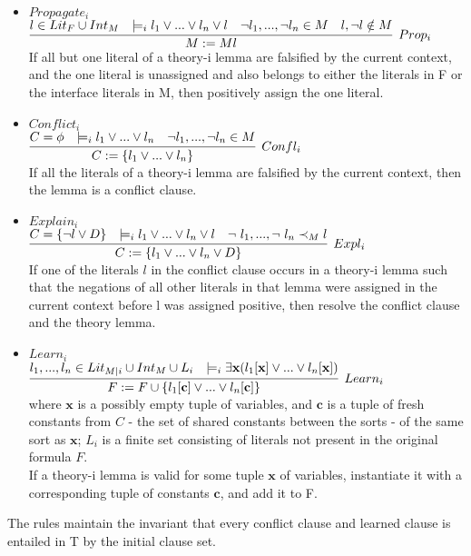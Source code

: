 \documentclass{article}
\begin{document}
\begin{itemize}
	\item $Propagate_i$ \\ $\infer[Prop_i]{M := Ml}	{l \in Lit_F \cup Int_M & 
		\models_i l_1 \lor ... \lor 
		l_n \lor l & \neg l_1, ..., \neg l_n \in M & l,\neg l \notin M}$ \\
	If all but one literal of a theory-i lemma are falsified by the 
	current context, and the one literal is unassigned and also belongs to 
	either the literals in F or the interface literals in M, then
	positively assign the one literal.
	\item $Conflict_i$ \\ $\infer[Confl_i]{C := \{l_1 \lor ... \lor l_n \}}
	{C = \phi & \models_i l_1 \lor ... \lor l_n & 
		\neg l_1, ..., \neg l_n \in M}$ \\
	If all the literals of a theory-i lemma are falsified by the 
	current context, then the lemma is a conflict clause.
	\item $Explain_i$ \\ $\infer[Expl_i]{C := \{l_1 \lor ... \lor l_n \lor D\}}
	{C = \{\neg l \lor D\} & \models_i l_1 \lor ... \lor l_n \lor l & 
		\neg\ l_1, ..., \neg\ l_n \prec_M l}$ \\
	If one of the literals $l$ in the conflict clause occurs in a 
	theory-i lemma such that the negations of all other literals in 
	that lemma were assigned in the current context before l was  
	assigned positive, then resolve the conflict clause and the 
	theory lemma.
	\item $Learn_i$ \\ $\infer[Learn_i]{F := F \cup \{l_1[\textbf{c}] 
		\lor ... \lor l_n[\textbf{c}]\}}
	{l_1,...,l_n \in Lit_{M|i} \cup Int_M \cup L_i & 
		\models_i \exists \textbf{x}(l_1[\textbf{x}] \lor ... 
		\lor l_n[\textbf{x}])}$ \\ where $\textbf{x}$ is a possibly empty 
	tuple of variables, and $\textbf{c}$ is a tuple of fresh constants 
	from $C$ - the set of shared constants between the sorts - of the
	same sort as $\textbf{x}$; $L_i$ is a finite set consisting of literals
	not present in the original formula $F$. \\
	If a theory-i lemma is valid for some tuple $\textbf{x}$ of variables,
	instantiate it with a corresponding tuple of constants $\textbf{c}$,
	and add it to F.
\end{itemize}
The rules maintain the invariant that every conflict clause and learned 
clause is entailed in T by the initial clause set. \\
\end{document}
